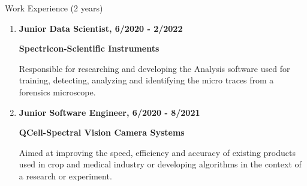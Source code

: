 \documentclass{resume} %
\begin{document}

\begin{rSection}{Work Experience (2 years)}
    \vspace*{1\baselineskip}
    \begin{enumerate}[label=\textbullet]
        \item \textbf{Junior Data Scientist, 6/2020 - 2/2022}\par
              \textbf{Spectricon-Scientific Instruments}\par
              Responsible for researching and developing the Analysis software used for training, detecting, analyzing and identifying the micro traces from a forensics microscope.\par
    
        \vspace*{1\baselineskip}
        \item \textbf{Junior Software Engineer, 6/2020 - 8/2021}\par
             \textbf{QCell-Spectral Vision Camera Systems}\par
              Aimed at improving the speed, efficiency and accuracy of existing products used in crop and medical industry or developing algorithms in the context of a research or experiment.
    \end{enumerate}
    \vspace*{1\baselineskip}
\end{rSection}

\end{document}
